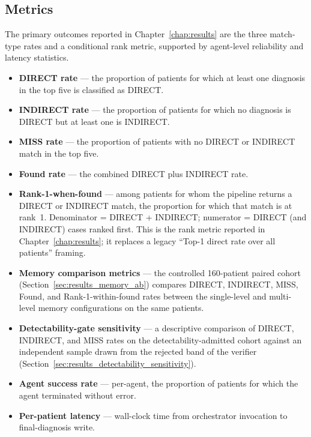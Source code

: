 \subsection{Metrics}
The primary outcomes reported in Chapter~\ref{chap:results} are the
three match-type rates and a conditional rank metric, supported by
agent-level reliability and latency statistics.
\begin{itemize}
  \item \textbf{DIRECT rate} --- the proportion of patients for which at
  least one diagnosis in the top five is classified as DIRECT.
  \item \textbf{INDIRECT rate} --- the proportion of patients for which
  no diagnosis is DIRECT but at least one is INDIRECT.
  \item \textbf{MISS rate} --- the proportion of patients with no
  DIRECT or INDIRECT match in the top five.
  \item \textbf{Found rate} --- the combined DIRECT plus INDIRECT rate.
  \item \textbf{Rank-1-when-found} --- among patients for whom the
  pipeline returns a DIRECT or INDIRECT match, the proportion for which
  that match is at rank~1. Denominator = DIRECT + INDIRECT;
  numerator = DIRECT (and INDIRECT) cases ranked first. This is the
  rank metric reported in Chapter~\ref{chap:results}; it replaces a
  legacy ``Top-1 direct rate over all patients'' framing.
  \item \textbf{Memory comparison metrics} --- the controlled
  160-patient paired cohort (Section~\ref{sec:results_memory_ab})
  compares DIRECT, INDIRECT, MISS, Found, and Rank-1-within-found
  rates between the single-level and multi-level memory configurations
  on the same patients.
  \item \textbf{Detectability-gate sensitivity} --- a descriptive
  comparison of DIRECT, INDIRECT, and MISS rates on the
  detectability-admitted cohort against an independent sample drawn
  from the rejected band of the verifier
  (Section~\ref{sec:results_detectability_sensitivity}).
  \item \textbf{Agent success rate} --- per-agent, the proportion of
  patients for which the agent terminated without error.
  \item \textbf{Per-patient latency} --- wall-clock time from
  orchestrator invocation to final-diagnosis write.
\end{itemize}

\FloatBarrier
